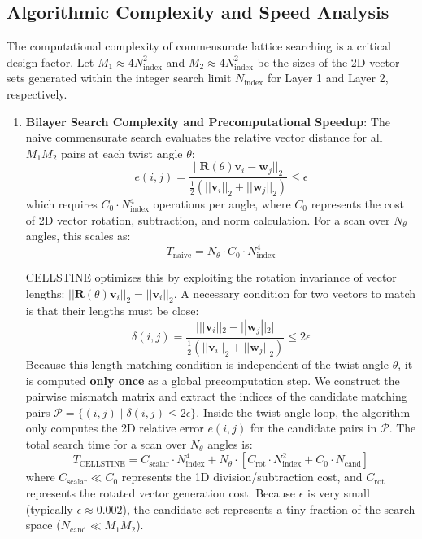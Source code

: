 \documentclass[9pt,a4paper,twoside]{tau-class/tau}
\begin{document}
\subsection{Algorithmic Complexity and Speed Analysis}
The computational complexity of commensurate lattice searching is a critical design factor. Let $M_1 \approx 4 N_{\text{index}}^2$ and $M_2 \approx 4 N_{\text{index}}^2$ be the sizes of the 2D vector sets generated within the integer search limit $N_{\text{index}}$ for Layer 1 and Layer 2, respectively.
\begin{enumerate}[label=\arabic*.]
    \item \textbf{Bilayer Search Complexity and Precomputational Speedup}: The naive commensurate search evaluates the relative vector distance for all $M_1 M_2$ pairs at each twist angle $\theta$:
    \begin{equation}
        e(i, j) = \frac{||\mathbf{R}(\theta)\mathbf{v}_i - \mathbf{w}_j||_2}{\frac{1}{2}(||\mathbf{v}_i||_2 + ||\mathbf{w}_j||_2)} \le \epsilon
    \end{equation}
    which requires $C_0 \cdot N_{\text{index}}^4$ operations per angle, where $C_0$ represents the cost of 2D vector rotation, subtraction, and norm calculation. For a scan over $N_{\theta}$ angles, this scales as:
    \begin{equation}
        T_{\text{naive}} = N_{\theta} \cdot C_0 \cdot N_{\text{index}}^4
    \end{equation}
    
    CELLSTINE optimizes this by exploiting the rotation invariance of vector lengths: $||\mathbf{R}(\theta)\mathbf{v}_i||_2 = ||\mathbf{v}_i||_2$. A necessary condition for two vectors to match is that their lengths must be close:
    \begin{equation}
        \delta(i, j) = \frac{| ||\mathbf{v}_i||_2 - ||\mathbf{w}_j||_2 |}{\frac{1}{2}(||\mathbf{v}_i||_2 + ||\mathbf{w}_j||_2)} \le 2\epsilon
    \end{equation}
    Because this length-matching condition is independent of the twist angle $\theta$, it is computed \textbf{only once} as a global precomputation step. We construct the pairwise mismatch matrix and extract the indices of the candidate matching pairs $\mathcal{P} = \{ (i, j) \mid \delta(i, j) \le 2\epsilon \}$. Inside the twist angle loop, the algorithm only computes the 2D relative error $e(i, j)$ for the candidate pairs in $\mathcal{P}$. The total search time for a scan over $N_{\theta}$ angles is:
    \begin{equation}
        T_{\text{CELLSTINE}} = C_{\text{scalar}} \cdot N_{\text{index}}^4 + N_{\theta} \cdot \left[ C_{\text{rot}} \cdot N_{\text{index}}^2 + C_0 \cdot N_{\text{cand}} \right]
    \end{equation}
    where $C_{\text{scalar}} \ll C_0$ represents the 1D division/subtraction cost, and $C_{\text{rot}}$ represents the rotated vector generation cost. Because $\epsilon$ is very small (typically $\epsilon \approx 0.002$), the candidate set represents a tiny fraction of the search space ($N_{\text{cand}} \ll M_1 M_2$).
    

\end{enumerate}
\end{document}
